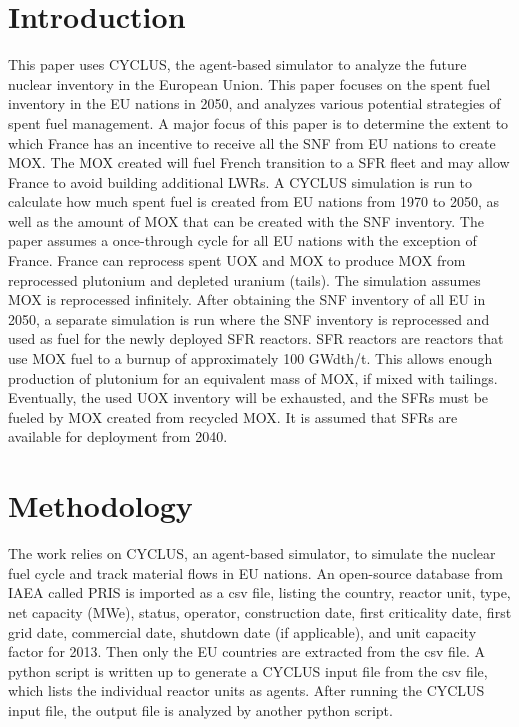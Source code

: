 \section{Introduction}
This paper uses CYCLUS, the agent-based simulator \cite{huff_fundamental_2016} to analyze
the future nuclear inventory in the European Union. This paper focuses on the spent fuel
inventory in the EU nations in 2050, and analyzes various potential strategies of spent fuel
management.
A major focus of this paper is to determine the extent to which France has an incentive
to receive all the \gls{SNF} from EU nations to create \gls{MOX}.
The \gls{MOX} created will fuel French transition to a \gls{SFR} fleet
and may allow France to avoid building additional \glspl{LWR}.
A CYCLUS simulation is run to calculate
how much spent fuel is created from EU nations from 1970 to 2050, as well as the amount
of \gls{MOX} that can be created with the \gls{SNF} inventory.
The paper assumes a once-through cycle for all 
EU nations with the exception of France. France can reprocess spent \gls{UOX} and \gls{MOX} to
produce \gls{MOX} from reprocessed plutonium and depleted uranium (tails).
The simulation assumes \gls{MOX} is reprocessed infinitely. 
After obtaining the \gls{SNF} inventory of all EU in 2050, a separate
simulation is run where the \gls{SNF} inventory is reprocessed and
used as fuel for the newly deployed \gls{SFR} reactors.
\gls{SFR} reactors are reactors that use \gls{MOX} fuel to a burnup
of approximately 100 GWdth/t. This allows enough production of plutonium
for an equivalent mass of \gls{MOX}, if mixed with tailings.  Eventually,
the used \gls{UOX} inventory will be exhausted, and the \glspl{SFR} must be
fueled by \gls{MOX} created from recycled \gls{MOX}.
It is assumed that \glspl{SFR} are available for deployment
from 2040. 


\section{Methodology}
The work relies on CYCLUS, an agent-based simulator, to simulate the nuclear fuel cycle
and track material flows in EU nations. An open-source database from \gls{IAEA} called
\gls{PRIS} is imported as a csv file, listing the country, reactor unit, type, net capacity (MWe), status,
operator, construction date, first criticality date, first grid date, commercial date, shutdown
date (if applicable), and unit capacity factor for 2013. Then only the EU countries are extracted
from the csv file. A python script is written up to generate a CYCLUS input file from the csv file,
which lists the individual reactor units as agents. After running the CYCLUS input file,
the output file is analyzed by another python script.

